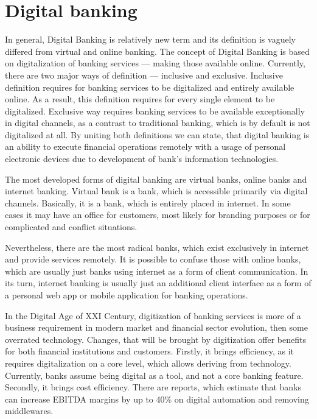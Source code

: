 
\section{Digital banking}

In general, Digital Banking is relatively new term and its definition is vaguely differed from virtual and online banking.
The concept of Digital Banking is based on digitalization of banking services — making those available online.
Currently, there are two major ways of definition — inclusive and exclusive.
Inclusive definition requires for banking services to be digitalized and entirely available online.
As a result, this definition requires for every single element to be digitalized.
Exclusive way requires banking services to be available exceptionally in digital channels, as a contrast to traditional banking, which is by default is not digitalized at all.
By uniting both definitions we can state, that digital banking is an ability to execute financial operations remotely with a usage of personal electronic devices due to development of bank's information technologies.
\cite{digital_banking_2020}

The most developed forms of digital banking are virtual banks, online banks and internet banking.
Virtual bank is a bank, which is accessible primarily via digital channels. 
Basically, it is a bank, which is entirely placed in internet.
In some cases it may have an office for customers, most likely for branding purposes or for complicated and conflict situations.

Nevertheless, there are the most radical banks, which exist exclusively in internet and provide services remotely.
It is possible to confuse those with online banks, which are usually just banks using internet as a form of client communication.
In its turn, internet banking is usually just an additional client interface as a form of a personal web app or mobile application for banking operations.

In the Digital Age of XXI Century, digitization of banking services is more of a business requirement in modern market and financial sector evolution, then some overrated technology.
Changes, that will be brought by digitization offer benefits for both financial institutions and customers.
Firstly, it brings efficiency, as it requires digitalization on a core level, which allows deriving from technology. 
Currently, banks assume being digital as a tool, and not a core banking feature.
Secondly, it brings cost efficiency. There are reports, which estimate that banks can increase EBITDA margins by up to 40\% on digital automation and removing middlewares.
\cite{rise_digital_bank_mckinsey}

